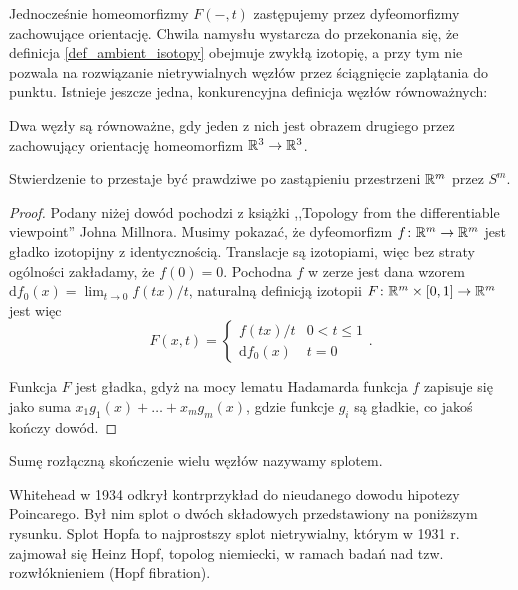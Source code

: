 Jednocześnie homeomorfizmy $F(-,t)$ zastępujemy przez dyfeomorfizmy zachowujące orientację.
Chwila namysłu wystarcza do przekonania się, że definicja \ref{def_ambient_isotopy} obejmuje zwykłą izotopię,
a przy tym nie pozwala na rozwiązanie nietrywialnych węzłów przez ściągnięcie zaplątania do punktu.
Istnieje jeszcze jedna, konkurencyjna definicja węzłów równoważnych:

\begin{definition}
	Dwa węzły są równoważne, gdy jeden z nich jest obrazem drugiego przez zachowujący orientację homeomorfizm $\mathbb R^3 \to \mathbb R^3$.
\end{definition}

Stwierdzenie to przestaje być prawdziwe po zastąpieniu przestrzeni $\mathbb R^m$ przez $S^m$.

\begin{proof}
	Podany niżej dowód pochodzi z książki ,,Topology from the differentiable viewpoint'' Johna Millnora.
	Musimy pokazać, że dyfeomorfizm $f \colon \mathbb R^m \to \mathbb R^m$ jest gładko izotopijny z identycznością.
	Translacje są izotopiami, więc bez straty ogólności zakładamy, że $f(0) = 0$.
	Pochodna $f$ w zerze jest dana wzorem $\mathrm{d}f_0(x) = \lim_{t \to 0} f(tx) /t$,
	naturalną definicją	izotopii $F \colon \mathbb R^m \times [0, 1] \to \mathbb R^m$ jest więc
	\[
		F(x, t) = \begin{cases}
			f(tx) / t & 0 < t \le 1 \\
			\mathrm{d}f_0(x) & t = 0
		\end{cases} .
	\]

	Funkcja $F$ jest gładka,
	gdyż na mocy lematu Hadamarda funkcja $f$ zapisuje się jako suma $x_1 g_1(x) + \ldots + x_mg_m(x)$,
	gdzie funkcje $g_i$ są gładkie, co jakoś kończy dowód.
\end{proof}

\begin{definition}[splot] \label{def_link}
	Sumę rozłączną skończenie wielu węzłów nazywamy splotem.
\end{definition}

\begin{example}
	Whitehead w 1934 odkrył kontrprzykład do nieudanego dowodu hipotezy Poincarego.
	Był nim splot o dwóch składowych przedstawiony na poniższym rysunku.
	Splot Hopfa to najprostszy splot nietrywialny, którym w 1931 r. zajmował się Heinz Hopf,
	topolog niemiecki, w ramach badań nad tzw. rozwłóknieniem (Hopf fibration).
\end{example}

